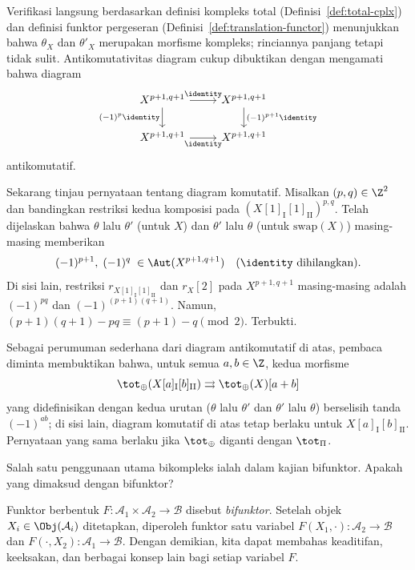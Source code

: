 \begin{bukti}
	Verifikasi langsung berdasarkan definisi kompleks total
	(Definisi~\ref{def:total-cplx}) dan definisi funktor pergeseran
	(Definisi~\ref{def:translation-functor}) menunjukkan bahwa $\theta_X$ dan
	$\theta'_X$ merupakan morfisme kompleks; rinciannya panjang tetapi tidak
	sulit. Antikomutativitas diagram cukup dibuktikan dengan mengamati bahwa diagram
	\[\begin{tikzcd}
		X^{p+1, q+1} \arrow[d, "{(-1)^p \identity}"'] \arrow[r, "\identity"] & X^{p+1, q+1} \arrow[d, "{(-1)^{p+1} \identity}"] \\
		X^{p+1, q+1} \arrow[r, "\identity"'] & X^{p+1, q+1}
	\end{tikzcd}\]
	antikomutatif.
	
	Sekarang tinjau pernyataan tentang diagram komutatif. Misalkan
	$(p,q)\in\Z^2$ dan bandingkan restriksi kedua komposisi pada
	$(X[1]_{\mathrm{I}}[1]_{\mathrm{II}})^{p,q}$. Telah dijelaskan bahwa
	$\theta$ lalu $\theta'$ (untuk $X$) dan $\theta'$ lalu $\theta$ (untuk
	$\mathrm{swap}(X)$) masing-masing memberikan
	\[ (-1)^{p+1}, \; (-1)^q \; \in \Aut(X^{p+1, q+1}) \quad \text{($\identity$ dihilangkan)}. \]
	Di sisi lain, restriksi $r_{X[1]_{\mathrm{I}}[1]_{\mathrm{II}}}$ dan
	$r_X[2]$ pada $X^{p+1,q+1}$ masing-masing adalah $(-1)^{pq}$ dan
	$(-1)^{(p+1)(q+1)}$. Namun,
	$(p+1)(q+1)-pq\equiv(p+1)-q\pmod{2}$. Terbukti.
\end{bukti}

Sebagai perumuman sederhana dari diagram antikomutatif di atas, pembaca
diminta membuktikan bahwa, untuk semua $a,b\in\Z$, kedua morfisme
\[ \tot_{\oplus}(X[a]_{\mathrm{I}}[b]_{\mathrm{II}}) \rightrightarrows \tot_{\oplus}(X)[a+b] \]
yang didefinisikan dengan kedua urutan ($\theta$ lalu $\theta'$ dan $\theta'$
lalu $\theta$) berselisih tanda $(-1)^{ab}$; di sisi lain, diagram komutatif
di atas tetap berlaku untuk $X[a]_{\mathrm{I}}[b]_{\mathrm{II}}$. Pernyataan
yang sama berlaku jika $\tot_{\oplus}$ diganti dengan $\tot_{\Pi}$.

Salah satu penggunaan utama bikompleks ialah dalam kajian bifunktor. Apakah
yang dimaksud dengan bifunktor?

\begin{konvensi}\label{con:bifunctor}
	Funktor berbentuk $F:\mathcal{A}_1\times\mathcal{A}_2\to\mathcal{B}$
	disebut \emph{bifunktor}. Setelah objek
	$X_i\in\Obj(\mathcal{A}_i)$ ditetapkan, diperoleh funktor satu variabel
	$F(X_1,\cdot):\mathcal{A}_2\to\mathcal{B}$ dan
	$F(\cdot,X_2):\mathcal{A}_1\to\mathcal{B}$. Dengan demikian, kita dapat membahas
	keaditifan, keeksakan, dan berbagai konsep lain bagi setiap variabel $F$.
\end{konvensi}


